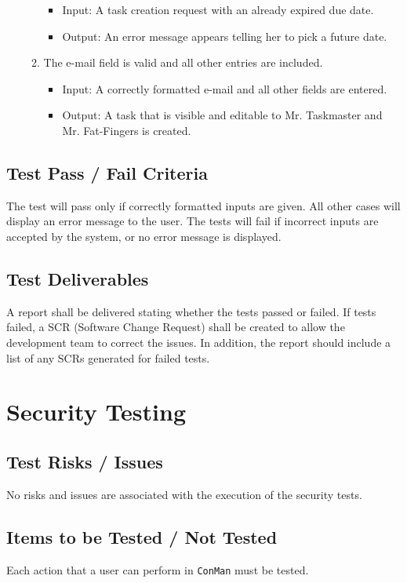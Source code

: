 \documentclass{article}
\begin{document}
\begin{enumerate}
\begin{enumerate}
            \begin{itemize}
                \item Input: A task creation request with an already expired
due date.
                \item Output: An error message appears telling her to pick a
future date.
            \end{itemize}
        \item The e-mail field is valid and all other entries are included.
            \begin{itemize}
                \item Input: A correctly formatted e-mail and all other fields
are entered.
                \item Output: A task that is visible and editable to Mr.
Taskmaster and Mr. Fat-Fingers is created.
            \end{itemize}
    \end{enumerate}
\end{enumerate}

\subsection{Test Pass / Fail Criteria}
The test will pass only if correctly formatted inputs are given.  
All other cases will display an error message to the user.  
The tests will fail if incorrect inputs are accepted by the system, or no error message is displayed.

\subsection{Test Deliverables}
A report shall be delivered stating whether the tests passed or failed. If tests failed, a SCR
(Software Change Request) shall be created to allow the development team to correct the
issues. In addition, the report should include a list of any SCRs generated for failed 
tests.

\newpage
\section{Security Testing}
\subsection{Test Risks / Issues}
No risks and issues are associated with the execution of the security tests.

\subsection{Items to be Tested / Not Tested}
Each action that a user can perform in \texttt{ConMan} must be tested.\newline
\end{document}

